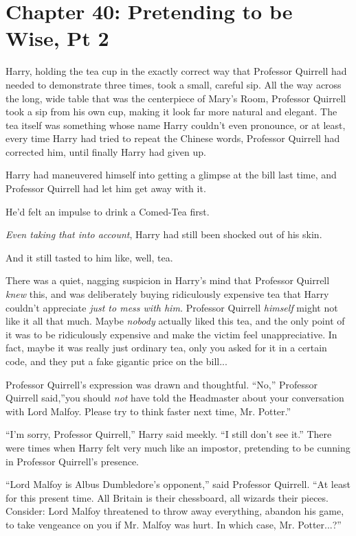 \chapter{Chapter 40: Pretending to be Wise, Pt 2}
Harry, holding the tea cup in the exactly correct way that Professor
Quirrell had needed to demonstrate three times, took a small, careful
sip. All the way across the long, wide table that was the centerpiece of
Mary's Room, Professor Quirrell took a sip from his own cup, making it
look far more natural and elegant. The tea itself was something whose
name Harry couldn't even pronounce, or at least, every time Harry had
tried to repeat the Chinese words, Professor Quirrell had corrected him,
until finally Harry had given up.

Harry had maneuvered himself into getting a glimpse at the bill last
time, and Professor Quirrell had let him get away with it.

He'd felt an impulse to drink a Comed-Tea first.

\emph{Even taking that into account}, Harry had still been shocked out
of his skin.

And it still tasted to him like, well, tea.

There was a quiet, nagging suspicion in Harry's mind that Professor
Quirrell \emph{knew} this, and was deliberately buying ridiculously
expensive tea that Harry couldn't appreciate \emph{just to mess with
him.} Professor Quirrell \emph{himself} might not like it all that much.
Maybe \emph{nobody} actually liked this tea, and the only point of it
was to be ridiculously expensive and make the victim feel
unappreciative. In fact, maybe it was really just ordinary tea, only you
asked for it in a certain code, and they put a fake gigantic price on
the bill...

Professor Quirrell's expression was drawn and thoughtful. ``No,''
Professor Quirrell said,''you should \emph{not} have told the Headmaster
about your conversation with Lord Malfoy. Please try to think faster
next time, Mr. Potter.''

``I'm sorry, Professor Quirrell,'' Harry said meekly. ``I still don't
see it.'' There were times when Harry felt very much like an impostor,
pretending to be cunning in Professor Quirrell's presence.

``Lord Malfoy is Albus Dumbledore's opponent,'' said Professor Quirrell.
``At least for this present time. All Britain is their chessboard, all
wizards their pieces. Consider: Lord Malfoy threatened to throw away
everything, abandon his game, to take vengeance on you if Mr. Malfoy was
hurt. In which case, Mr. Potter...?''

